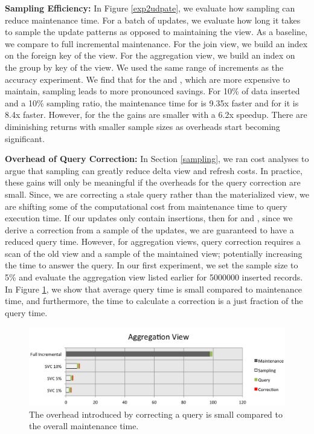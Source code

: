 {\noindent \bf Sampling Efficiency: }
In Figure \ref{exp2udpate}, we evaluate how sampling can reduce maintenance time.
For a batch of updates, we evaluate how long it takes to sample the update patterns as opposed to maintaining the view.
As a baseline, we compare to full incremental maintenance.
For the join view, we build an index on the foreign key of the view.
For the aggregation view, we build an index on the group by key of the view.
We used the same range of increments as the accuracy experiment.
We find that for the \aggview and \fjview, which are more expensive to maintain, sampling leads to more pronounced savings. 
For 10\% of data inserted and a 10\% sampling ratio, the maintenance time for \fjview  is 9.35x faster and for \aggview it is 8.4x faster.
However, for the \spview the gains are smaller with a 6.2x speedup.
There are diminishing returns with smaller sample sizes as overheads start becoming significant. 

{\noindent \bf Overhead of Query Correction: }
In Section \ref{sampling}, we ran cost analyses to argue that sampling can greatly reduce delta view and refresh costs.
In practice, these gains will only be meaningful if the overheads for the query correction are small.
Since, we are correcting a stale query rather than the materialized view, we are shifting some of the computational cost from maintenance time to query execution time.
If our updates only contain insertions, then for \spview and \fjview, since we derive a correction from a sample of the updates, we are guaranteed to have a reduced query time.
However, for aggregation views, query correction requires a scan of the old view and a sample of the maintained view; potentially increasing the time to 
answer the query. 
In our first experiment, we set the sample size to 5\% and evaluate the aggregation view listed earlier for 5000000 inserted records. 
In Figure \ref{exp10overheads}, we show that average query time is small compared to maintenance time, and furthermore, 
the time to calculate a correction is a just fraction of the query time.
\begin{figure}[h]
\label{exp10overheads}
\centering
 \includegraphics[width=\columnwidth]{exp/total_time_agg_view.png}
 \caption{The overhead introduced by correcting a query is small compared to the overall maintenance time.}
\end{figure}

